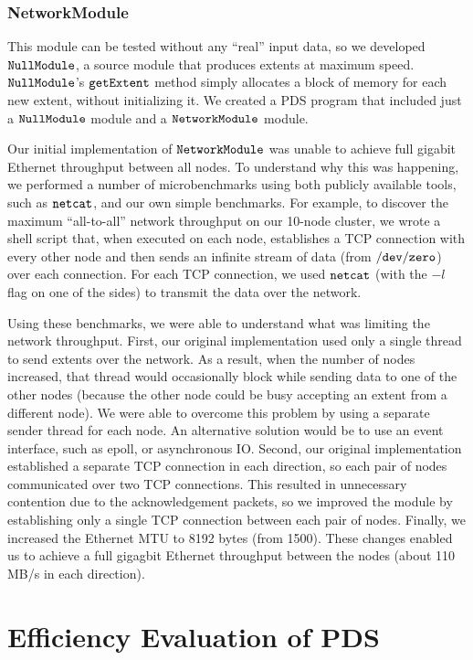 \documentclass[ 11pt, letterpaper]{article}%
\begin{document}
\subsubsection{NetworkModule}
  
This module can be tested without any ``real''  
  input data, so we developed $\tt NullModule$, a source module that produces
  extents at maximum speed. $\tt NullModule$'s $\tt getExtent$ method simply allocates  
  a block of memory for each new extent, without initializing it. We created a  
  PDS program that included just a $\tt NullModule$ module and a $\tt  
  NetworkModule$ module.
  
  Our initial implementation of $\tt NetworkModule$ was  
  unable to achieve full gigabit Ethernet throughput between all nodes. To
  understand why this was happening, we performed a number of microbenchmarks
  using both publicly available tools, such as $\tt netcat$, and our own simple benchmarks. For example, to discover the maximum ``all-to-all'' network throughput on our
 10-node cluster, we wrote a shell script that, when executed on each node, establishes
 a TCP connection with every other node and then sends an infinite stream
of data (from $\tt /dev/zero$) over each connection. For each TCP connection, we
used $\tt netcat$ (with the $-l$ flag on one of the sides) to transmit the data
over the network.
   
 Using these benchmarks, we were able to understand what was limiting the
 network throughput. First, our original implementation used only a single
 thread to send extents over the network. As a result, when the number of nodes
 increased, that thread would occasionally block while sending data to one of
 the other nodes (because the other node could be busy accepting an extent from
 a different node). We were able to overcome this problem by using a separate
 sender thread for each node. An alternative solution would be to use an event
 interface, such as epoll, or asynchronous IO. Second, our original
 implementation established a separate TCP connection in each direction, so
 each pair of nodes communicated over two TCP connections. This resulted in 
 unnecessary contention due to the acknowledgement packets, so we improved the
 module by establishing only a single TCP connection between each pair of
 nodes. Finally, we increased the Ethernet MTU to 8192 bytes (from 1500). These
 changes enabled us to achieve a full gigagbit Ethernet throughput between the
 nodes (about 110 MB/s in each direction).


\section{Efficiency Evaluation of PDS}
\end{document}
